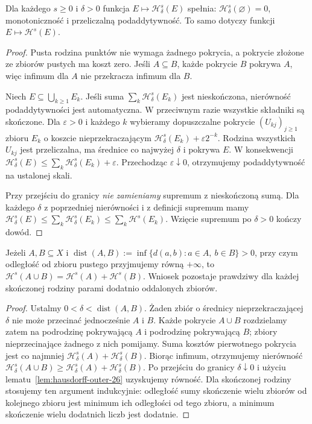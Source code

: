 \begin{lemat}
\label{lem:hausdorff-outer-26}
Dla każdego $s\geq0$ i $\delta>0$ funkcja
$E\mapsto\mathcal H^s_\delta(E)$ spełnia:
$\mathcal H^s_\delta(\varnothing)=0$,
monotoniczność i przeliczalną podaddytywność.
To samo dotyczy funkcji $E\mapsto\mathcal H^s(E)$.
\end{lemat}
\begin{proof}
Pusta rodzina punktów nie wymaga żadnego pokrycia,
a pokrycie złożone ze zbiorów pustych ma koszt zero.
Jeśli $A\subseteq B$, każde pokrycie $B$ pokrywa $A$,
więc infimum dla $A$ nie przekracza infimum dla $B$.

Niech $E\subseteq\bigcup_{k\ge1}E_k$. Jeśli suma
$\sum_k\mathcal H^s_\delta(E_k)$ jest nieskończona,
nierówność podaddytywności jest automatyczna.
W przeciwnym razie wszystkie składniki są skończone.
Dla $\varepsilon>0$ i każdego $k$ wybieramy dopuszczalne
pokrycie $(U_{kj})_{j\ge1}$ zbioru $E_k$ o koszcie
nieprzekraczającym
$\mathcal H^s_\delta(E_k)+\varepsilon2^{-k}$.
Rodzina wszystkich $U_{kj}$ jest przeliczalna,
ma średnice co najwyżej $\delta$ i pokrywa $E$.
W konsekwencji
$\mathcal H^s_\delta(E)\leq
\sum_k\mathcal H^s_\delta(E_k)+\varepsilon$.
Przechodząc $\varepsilon\downarrow0$, otrzymujemy
podaddytywność na ustalonej skali.

Przy przejściu do granicy \emph{nie zamieniamy}
supremum z nieskończoną sumą. Dla każdego $\delta$
z poprzedniej nierówności i z definicji supremum mamy
$\mathcal H^s_\delta(E)\leq
\sum_k\mathcal H^s_\delta(E_k)
\leq\sum_k\mathcal H^s(E_k)$.
Wzięcie supremum po $\delta>0$ kończy dowód.
\end{proof}

\begin{lemat}
\label{lem:hausdorff-metricity-26}
Jeżeli $A,B\subseteq X$ i
$\operatorname{dist}(A,B):=
\inf\{d(a,b):a\in A,\ b\in B\}>0$,
przy czym odległość od zbioru pustego przyjmujemy równą $+\infty$,
to $\mathcal H^s(A\cup B)=\mathcal H^s(A)+\mathcal H^s(B)$.
Wniosek pozostaje prawdziwy dla każdej skończonej
rodziny parami dodatnio oddalonych zbiorów.
\end{lemat}
\begin{proof}
Ustalmy $0<\delta<\operatorname{dist}(A,B)$.
Żaden zbiór o średnicy nieprzekraczającej $\delta$
nie może przecinać jednocześnie $A$ i $B$.
Każde pokrycie $A\cup B$ rozdzielamy zatem na
podrodzinę pokrywającą $A$ i podrodzinę pokrywającą
$B$; zbiory nieprzecinające żadnego z nich pomijamy.
Suma kosztów pierwotnego pokrycia jest co najmniej
$\mathcal H^s_\delta(A)+\mathcal H^s_\delta(B)$.
Biorąc infimum, otrzymujemy nierówność
$\mathcal H^s_\delta(A\cup B)\geq
\mathcal H^s_\delta(A)+\mathcal H^s_\delta(B)$.
Po przejściu do granicy $\delta\downarrow0$
i użyciu lematu~\ref{lem:hausdorff-outer-26}
uzyskujemy równość. Dla skończonej rodziny stosujemy ten argument indukcyjnie:
odległość sumy skończenie wielu zbiorów od kolejnego zbioru
jest minimum ich odległości od tego zbioru, a minimum
skończenie wielu dodatnich liczb jest dodatnie.
\end{proof}

